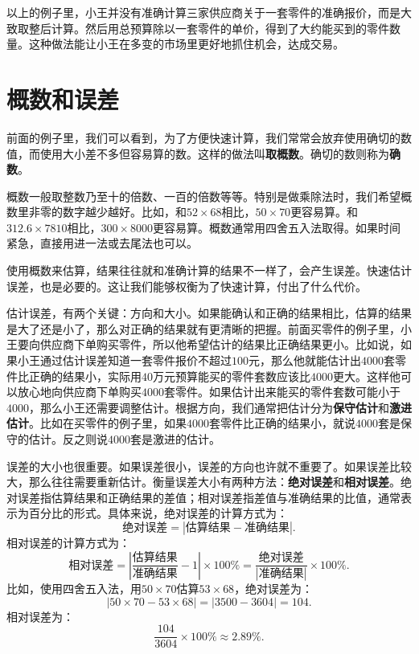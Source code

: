 \documentclass[12pt,UTF8]{ctexbook}
\begin{document}
以上的例子里，小王并没有准确计算三家供应商关于一套零件的准确报价，而是大致取整后计算。然后用总预算除以一套零件的单价，得到了大约能买到的零件数量。这种做法能让小王在多变的市场里更好地抓住机会，达成交易。

\section{概数和误差}

前面的例子里，我们可以看到，为了方便快速计算，我们常常会放弃使用确切的数值，而使用大小差不多但容易算的数。这样的做法叫\textbf{取概数}。确切的数则称为\textbf{确数}。

概数一般取整数乃至十的倍数、一百的倍数等等。特别是做乘除法时，我们希望概数里非零的数字越少越好。比如，和$52 \times 68$相比，$50\times 70$更容易算。和$312.6 \times 7810$相比，$300 \times 8000$更容易算。概数通常用四舍五入法取得。如果时间紧急，直接用进一法或去尾法也可以。

使用概数来估算，结果往往就和准确计算的结果不一样了，会产生误差。快速估计误差，也是必要的。这让我们能够权衡为了快速计算，付出了什么代价。

估计误差，有两个关键：方向和大小。如果能确认和正确的结果相比，估算的结果是大了还是小了，那么对正确的结果就有更清晰的把握。前面买零件的例子里，小王要向供应商下单购买零件，所以他希望估计的结果比正确结果更小。比如说，如果小王通过估计误差知道一套零件报价不超过$100$元，那么他就能估计出$4000$套零件比正确的结果小，实际用$40$万元预算能买的零件套数应该比$4000$更大。这样他可以放心地向供应商下单购买$4000$套零件。如果估计出来能买的零件套数可能小于$4000$，那么小王还需要调整估计。根据方向，我们通常把估计分为\textbf{保守估计}和\textbf{激进估计}。比如在买零件的例子里，如果$4000$套零件比正确的结果小，就说$4000$套是保守的估计。反之则说$4000$套是激进的估计。

误差的大小也很重要。如果误差很小，误差的方向也许就不重要了。如果误差比较大，那么往往需要重新估计。衡量误差大小有两种方法：\textbf{绝对误差}和\textbf{相对误差}。绝对误差指估算结果和正确结果的差值；相对误差指差值与准确结果的比值，通常表示为百分比的形式。具体来说，绝对误差的计算方式为：
$$ \text{绝对误差} = \left|\text{估算结果} - \text{准确结果}\right|. $$
相对误差的计算方式为：
$$ \text{相对误差} = \left|\frac{\text{估算结果}}{\text{准确结果}} - 1\right| \times 100\% = \frac{\text{绝对误差}}{|\text{准确结果}|} \times 100\%. $$
比如，使用四舍五入法，用$50\times 70$估算$53 \times 68$，绝对误差为：
$$  \left|50\times 70 - 53 \times 68\right| = |3500 - 3604| = 104. $$
相对误差为：
$$ \frac{104}{3604} \times 100\% \approx 2.89\%. $$
\end{document}
